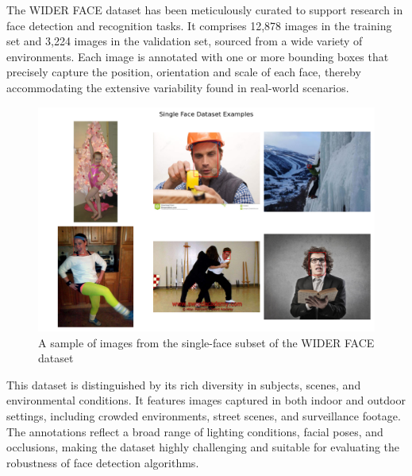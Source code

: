 The WIDER FACE dataset \cite{yang2016wider} has been meticulously curated to support research in face detection and recognition tasks. It comprises 12,878 images in the training set and 3,224 images in the validation set, sourced from a wide variety of environments. Each image is annotated with one or more bounding boxes that precisely capture the position, orientation and scale of each face, thereby accommodating the extensive variability found in real-world scenarios.

\begin{figure}[!htb]
    \centering{}
    \includegraphics[scale=0.35]{m+m_images/single_face_figure_samples.png}
    \caption{A sample of images from the single-face subset of the WIDER FACE dataset}
    \label{figure:singlefacesamples}
\end{figure}

This dataset is distinguished by its rich diversity in subjects, scenes, and environmental conditions. It features images captured in both indoor and outdoor settings, including crowded environments, street scenes, and surveillance footage. The annotations reflect a broad range of lighting conditions, facial poses, and occlusions, making the dataset highly challenging and suitable for evaluating the robustness of face detection algorithms.

